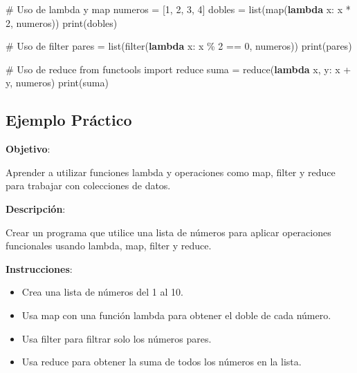 \documentclass[
  a4paper,
  DIV=11,
  numbers=noendperiod,
  onepage,
  openany]{scrreprt}
\newenvironment{Shaded}{\begin{snugshade}}{\end{snugshade}}
\newcommand{\BuiltInTok}[1]{\textcolor[rgb]{0.00,0.23,0.31}{#1}}
\newcommand{\CommentTok}[1]{\textcolor[rgb]{0.37,0.37,0.37}{#1}}
\newcommand{\DecValTok}[1]{\textcolor[rgb]{0.68,0.00,0.00}{#1}}
\newcommand{\ImportTok}[1]{\textcolor[rgb]{0.00,0.46,0.62}{#1}}
\newcommand{\KeywordTok}[1]{\textcolor[rgb]{0.00,0.23,0.31}{\textbf{#1}}}
\newcommand{\NormalTok}[1]{\textcolor[rgb]{0.00,0.23,0.31}{#1}}
\newcommand{\OperatorTok}[1]{\textcolor[rgb]{0.37,0.37,0.37}{#1}}
\begin{document}
\begin{Shaded}
\begin{Highlighting}[]
\CommentTok{\# Uso de lambda y map}
\NormalTok{numeros }\OperatorTok{=}\NormalTok{ [}\DecValTok{1}\NormalTok{, }\DecValTok{2}\NormalTok{, }\DecValTok{3}\NormalTok{, }\DecValTok{4}\NormalTok{]}
\NormalTok{dobles }\OperatorTok{=} \BuiltInTok{list}\NormalTok{(}\BuiltInTok{map}\NormalTok{(}\KeywordTok{lambda}\NormalTok{ x: x }\OperatorTok{*} \DecValTok{2}\NormalTok{, numeros))}
\BuiltInTok{print}\NormalTok{(dobles)}

\CommentTok{\# Uso de filter}
\NormalTok{pares }\OperatorTok{=} \BuiltInTok{list}\NormalTok{(}\BuiltInTok{filter}\NormalTok{(}\KeywordTok{lambda}\NormalTok{ x: x }\OperatorTok{\%} \DecValTok{2} \OperatorTok{==} \DecValTok{0}\NormalTok{, numeros))}
\BuiltInTok{print}\NormalTok{(pares)}

\CommentTok{\# Uso de reduce}
\ImportTok{from}\NormalTok{ functools }\ImportTok{import} \BuiltInTok{reduce}
\NormalTok{suma }\OperatorTok{=} \BuiltInTok{reduce}\NormalTok{(}\KeywordTok{lambda}\NormalTok{ x, y: x }\OperatorTok{+}\NormalTok{ y, numeros)}
\BuiltInTok{print}\NormalTok{(suma)}
\end{Highlighting}
\end{Shaded}

\subsection{Ejemplo Práctico}\label{ejemplo-pruxe1ctico-3}

\textbf{Objetivo}:

Aprender a utilizar funciones lambda y operaciones como map, filter y
reduce para trabajar con colecciones de datos.

\textbf{Descripción}:

Crear un programa que utilice una lista de números para aplicar
operaciones funcionales usando lambda, map, filter y reduce.

\textbf{Instrucciones}:

\begin{itemize}
\item
  Crea una lista de números del 1 al 10.
\item
  Usa map con una función lambda para obtener el doble de cada número.
\item
  Usa filter para filtrar solo los números pares.
\item
  Usa reduce para obtener la suma de todos los números en la lista.
\end{itemize}
\end{document}
